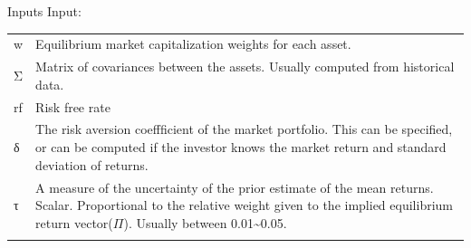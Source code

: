 \documentclass[presentation]{beamer}
\begin{document}
\begin{frame}[label={sec:orgheadline25}]{Inputs}
Input:
\begin{center}
\begin{tabular}{ll}
w & Equilibrium market capitalization weights for each asset.\\
Σ & Matrix of covariances between the assets. Usually computed from historical data.\\
rf & Risk free rate\\
δ & The risk aversion coeffficient of the market portfolio. This can be specified, or can be computed if the investor knows the market return and standard deviation of returns.\\
τ & A measure of the uncertainty of the prior estimate of the mean returns.   Scalar. Proportional to the relative weight given to the implied equilibrium return vector(\(\Pi\)).       Usually between 0.01\textasciitilde{}0.05.\\
\\
\end{tabular}
\end{center}
\end{frame}
\end{document}
